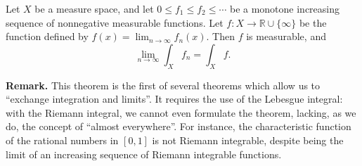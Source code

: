 \documentclass[12pt]{article}
\begin{document}
Let $X$ be a measure space, and let $0\leq f_1\leq f_2\leq\cdots$ be a monotone increasing sequence of nonnegative measurable functions. Let $f\colon X \to \mathbb{R}\cup \{\infty\}$ be the
function defined by $f(x) = \lim_{n\rightarrow\infty} f_n(x)$.
Then $f$ is measurable, and 
$$\lim_{n\rightarrow\infty} \int_X f_n = \int_X f.$$

\textbf{Remark.} This theorem is the first of several theorems which allow us to ``exchange integration and limits''.  It requires the use of the Lebesgue integral: with the Riemann integral, we cannot even formulate the theorem, lacking, as we do, the concept of ``almost everywhere''.  For instance, the characteristic function of the rational numbers in $[0,1]$ is not Riemann integrable, despite being the limit of an increasing sequence of Riemann integrable functions.
\end{document}
